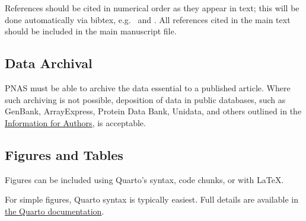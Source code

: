 \documentclass[
  9pt,
  twocolumn,
  twoside]{pnas-new}
\begin{document}
References should be cited in numerical order as they appear in text;
this will be done automatically via bibtex, e.g.~\cite{belkin2002using}
and
\cite{berard1994embedding,coifman2005geometric,phdthesis,masterthesis}.
All references cited in the main text should be included in the main
manuscript file.

\subsection*{Data Archival}\label{data-archival}

PNAS must be able to archive the data essential to a published article.
Where such archiving is not possible, deposition of data in public
databases, such as GenBank, ArrayExpress, Protein Data Bank, Unidata,
and others outlined in the
\href{https://www.pnas.org/author-center/editorial-and-journal-policies\#materials-and-data-availability}{Information
for Authors}, is acceptable.

\subsection*{Figures and Tables}\label{figures-and-tables}

Figures can be included using Quarto's syntax, code chunks, or with
LaTeX.

For simple figures, Quarto syntax is typically easiest. Full details are
available in \href{https://quarto.org/docs/authoring/figures.html}{the
Quarto documentation}.
\end{document}
